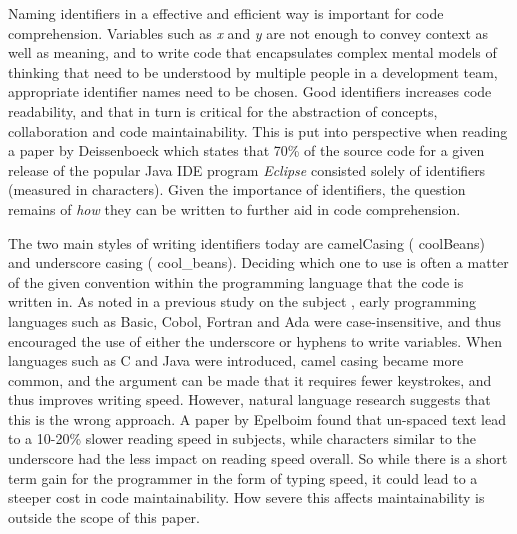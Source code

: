 \iffalse
\begin{itemize}
	\item Identifier names are important
	\item We have two identifier styles
	\item Some history 
	\item Two other studies
	\item Some background on them
	\item Reference all terms introduced
\end{itemize}
\fi

Naming identifiers in a effective and efficient way is important for code comprehension. Variables such as \textit{x} and \textit{y} are not enough to convey context as well as meaning, and to write code that encapsulates complex mental models of thinking that need to be understood by multiple people in a development team, appropriate identifier names need to be chosen\cite{naming-and-code-quality, code-quality-metric, identifier-study}. Good identifiers increases code readability, and that in turn is critical for the abstraction of concepts, collaboration and code maintainability\cite{readability-maintenance, identifier-study}. This is put into perspective when reading a paper by Deissenboeck \etal{} \cite{Concise-Naming} which states that 70\% of the source code for a given release of the popular Java IDE program \textit{Eclipse} consisted solely of identifiers (measured in characters). Given the importance of identifiers, the question remains of \textit{how} they can be written to further aid in code comprehension.

The two main styles of writing identifiers today are camelCasing (\eg{} coolBeans) and underscore casing (\eg{} cool\_beans). Deciding which one to use is often a matter of the given convention within the programming language that the code is written in. As noted in a previous study on the subject \cite{eye-tracking-study}, early programming languages such as Basic, Cobol, Fortran and Ada were case-insensitive, and thus encouraged the use of either the underscore or hyphens to write variables. When languages such as C and Java were introduced, camel casing became more common, and the argument can be made that it requires fewer keystrokes, and thus improves writing speed. However, natural language research suggests that this is the wrong approach. A paper by Epelboim \etal{} \cite{Fillers-in-text} found that un-spaced text lead to a 10-20\% slower reading speed in subjects, while characters similar to the underscore had the less impact on reading speed overall. So while there is a short term gain for the programmer in the form of typing speed, it could lead to a steeper cost in code maintainability. How severe this affects maintainability is outside the scope of this paper.

